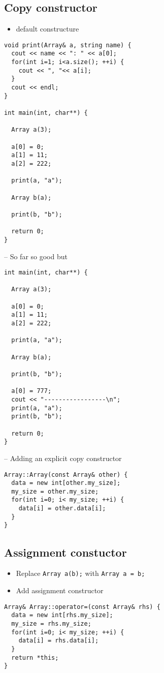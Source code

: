 \documentclass[11pt]{article}
\begin{document}
\subsection{Copy constructor}
\label{sec:orgbd0c264}
\begin{itemize}
\item default constructure
\end{itemize}
\begin{verbatim}
void print(Array& a, string name) {
  cout << name << ": " << a[0];
  for(int i=1; i<a.size(); ++i) {
    cout << ", "<< a[i];
  }
  cout << endl;
}

int main(int, char**) {

  Array a(3);

  a[0] = 0;
  a[1] = 11;
  a[2] = 222;

  print(a, "a");

  Array b(a);

  print(b, "b");

  return 0;
}
\end{verbatim}
-- So far so good but
\begin{verbatim}
int main(int, char**) {

  Array a(3);

  a[0] = 0;
  a[1] = 11;
  a[2] = 222;

  print(a, "a");

  Array b(a);

  print(b, "b");

  a[0] = 777;
  cout << "-----------------\n";
  print(a, "a");
  print(b, "b");

  return 0;
}
\end{verbatim}
-- Adding an explicit copy constructor
\begin{verbatim}
Array::Array(const Array& other) {
  data = new int[other.my_size];
  my_size = other.my_size;
  for(int i=0; i< my_size; ++i) {
    data[i] = other.data[i];
  }
}
\end{verbatim}

\subsection{Assignment constuctor}
\label{sec:org75773f9}
\begin{itemize}
\item Replace \texttt{Array a(b);} with \texttt{Array a = b;}
\item Add assignment constructor
\end{itemize}
\begin{verbatim}
Array& Array::operator=(const Array& rhs) {
  data = new int[rhs.my_size];
  my_size = rhs.my_size;
  for(int i=0; i< my_size; ++i) {
    data[i] = rhs.data[i];
  }
  return *this;
}    
\end{verbatim}
\end{document}
